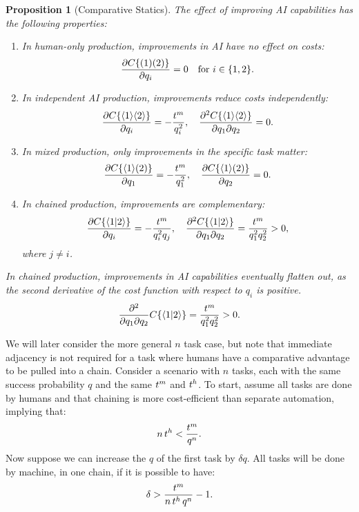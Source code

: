 \documentclass{article}
\theoremstyle{plain}
\theoremstyle{plain}
\newtheorem{proposition}{Proposition}
\begin{document}
\begin{proposition}[Comparative Statics] \label{prop:comparative_statics}
  The effect of improving AI capabilities has the following properties:
  \begin{enumerate}
  \item In human-only production, improvements in AI have no effect on costs:
  \[
  \frac{\partial C\{ ( 1 )( 2 ) \}}{\partial q_i} = 0 \quad \text{for } i \in \{1,2\}.
  \]
  \item In independent AI production, improvements reduce costs independently:
  \[
  \frac{\partial C\{ \langle 1 \rangle\langle 2 \rangle \}}{\partial q_i} = -\frac{t^{m}_{}}{q_i^2}, \quad \frac{\partial^2 C\{ \langle 1 \rangle\langle 2 \rangle \}}{\partial q_1 \partial q_2} = 0.
  \]
  \item In mixed production, only improvements in the specific task matter:
  \[
  \frac{\partial C\{ \langle 1 \rangle( 2 ) \}}{\partial q_1} = -\frac{t^{m}_{}}{q_1^2}, \quad \frac{\partial C\{ \langle 1 \rangle( 2 ) \}}{\partial q_2} = 0.
  \]
  \item In chained production, improvements are complementary:
  \[
  \frac{\partial C\{ \langle 1|2 \rangle \}}{\partial q_i} = -\frac{t^{m}_{}}{q_i^2 q_j}, \quad \frac{\partial^2 C\{ \langle 1|2 \rangle \}}{\partial q_1 \partial q_2} = \frac{t^{m}_{}}{q_1^2 q_2^2} > 0,
  \]
  where \(j \neq i\).
  \end{enumerate}

  In chained production, improvements in AI capabilities eventually flatten out, as the second derivative of the cost function with respect to \(q_i\) is positive.
  \begin{equation}
      \frac{\partial^2}{\partial q_1 \partial q_2} C\{ \langle 1|2 \rangle \} = \frac{t^{m}_{}}{q_1^2 q_2^2} > 0.
  \end{equation}

\end{proposition}
 
We will later consider the more general \(n\) task case, but note that immediate adjacency is not required for a task where humans have a comparative advantage to be pulled into a chain.
Consider a scenario with \(n\) tasks, each with the same success probability \(q\) and the same \(t^{m}_{}\) and \(t^{h}_{}\).
To start, assume all tasks are done by humans and that chaining is more cost-efficient than separate automation, implying that:
\[
n\, t^{h}_{} < \frac{t^{m}_{}}{q^n}.
\]
Now suppose we can increase the \(q\) of the first task by \(\delta q\). 
All tasks will be done by machine, in one chain, if it is possible to have:
\begin{align}
  \delta > \frac{t^{m}_{}}{n\, t^{h}_{}{}\, q^{n}} - 1.
\end{align} 
\end{document}
